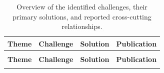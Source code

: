 \begin{longtable}{@{}|
    >{\raggedright\arraybackslash}p{}|
    >{\raggedright\arraybackslash}p{}|
    >{\raggedright\arraybackslash}p{}|
    >{\raggedright\arraybackslash}p{}|
@{}}
    \caption{Overview of the identified challenges, their primary solutions, and reported cross-cutting relationships.}
    \label{table:challenges-and-solutions-overview}\\
    \hline
    \textbf{Theme} & \textbf{Challenge} & \textbf{Solution} & \textbf{Publication} \\
    \hline
    \endfirsthead

    \multicolumn{4}{@{}l}{\tablename~\thetable\ continued}\\
    \hline
    \textbf{Theme} & \textbf{Challenge} & \textbf{Solution} & \textbf{Publication} \\
    \hline
    \endhead

    \hline
    \endfoot


\end{longtable}
